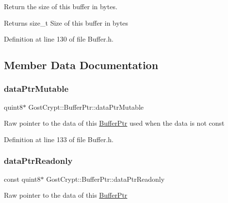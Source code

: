 Return the size of this buffer in bytes. 

\begin{DoxyReturn}{Returns}
size\+\_\+t Size of this buffer in bytes 
\end{DoxyReturn}


Definition at line 130 of file Buffer.\+h.



\subsection{Member Data Documentation}
\mbox{\label{class_gost_crypt_1_1_buffer_ptr_a705d4df0cd4a71f2bd1e7cb8c9199f4b}} 
\subsubsection{\texorpdfstring{data\+Ptr\+Mutable}{dataPtrMutable}}
{\footnotesize\ttfamily quint8$\ast$ Gost\+Crypt\+::\+Buffer\+Ptr\+::data\+Ptr\+Mutable\hspace{0.3cm}{\ttfamily [protected]}}

Raw pointer to the data of this \hyperlink{class_gost_crypt_1_1_buffer_ptr}{Buffer\+Ptr} used when the data is not const 

Definition at line 133 of file Buffer.\+h.

\mbox{\label{class_gost_crypt_1_1_buffer_ptr_a30b605a84eb010568c14aa42bdafe2d3}} 
\subsubsection{\texorpdfstring{data\+Ptr\+Readonly}{dataPtrReadonly}}
{\footnotesize\ttfamily const quint8$\ast$ Gost\+Crypt\+::\+Buffer\+Ptr\+::data\+Ptr\+Readonly\hspace{0.3cm}{\ttfamily [protected]}}

Raw pointer to the data of this \hyperlink{class_gost_crypt_1_1_buffer_ptr}{Buffer\+Ptr} 

